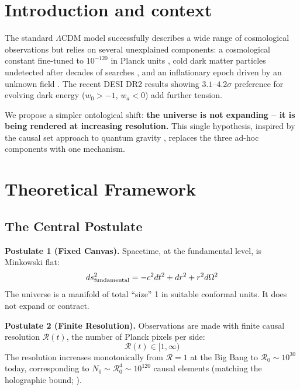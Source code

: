 \documentclass[12pt]{article}
\begin{document}
\section{Introduction and context}
\label{sec:intro}

The standard $\Lambda$CDM model successfully describes a wide range of cosmological observations but relies on several unexplained components: a cosmological constant fine-tuned to $10^{-120}$ in Planck units \citep{weinberg1989}, cold dark matter particles undetected after decades of searches \citep{bertone2018}, and an inflationary epoch driven by an unknown field \citep{guth1981}. The recent DESI DR2 results \citep{desi2025} showing $3.1$--$4.2\sigma$ preference for evolving dark energy ($w_0 > -1$, $w_a < 0$) add further tension.

We propose a simpler ontological shift: {\bf the universe is not expanding -- it is being rendered at increasing resolution.} This single hypothesis, inspired by the causal set approach to quantum gravity \citep{bombelli1987,sorkin2003}, replaces the three ad-hoc components with one mechanism.

\section{Theoretical Framework}
\label{sec:theory}

\subsection{The Central Postulate}
\label{sec:postulate}

{\bf Postulate 1 (Fixed Canvas).} Spacetime, at the fundamental level, is Minkowski flat:
\begin{equation}
ds^2_{\rm fundamental} = -c^2 dt^2 + dr^2 + r^2 d\Omega^2
\end{equation}
The universe is a manifold of total ``size'' 1 in suitable conformal units. It does not expand or contract.

{\bf Postulate 2 (Finite Resolution).} Observations are made with finite causal resolution $\mathcal{R}(t)$, the number of Planck pixels per side:
\begin{equation}
\mathcal{R}(t) \in [1, \infty)
\end{equation}
The resolution increases monotonically from $\mathcal{R} = 1$ at the Big Bang to $\mathcal{R}_0 \sim 10^{30}$ today, corresponding to $N_0 \sim \mathcal{R}_0^4 \sim 10^{120}$ causal elements (matching the holographic bound; \citealp{bousso2002}).
\end{document}
